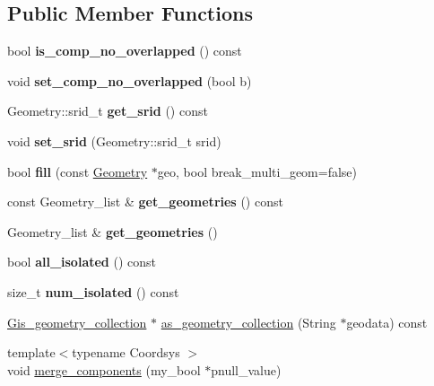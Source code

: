 \subsection*{Public Member Functions}
\begin{DoxyCompactItemize}
\item 
\mbox{\label{classBG__geometry__collection_ab8dca5aefde780d0410bdcca93f70b82}} 
bool {\bfseries is\+\_\+comp\+\_\+no\+\_\+overlapped} () const
\item 
\mbox{\label{classBG__geometry__collection_a1082cce97bb8411af16940999885ad6d}} 
void {\bfseries set\+\_\+comp\+\_\+no\+\_\+overlapped} (bool b)
\item 
\mbox{\label{classBG__geometry__collection_ab15273d17d8eaa7417b9155e4da46a64}} 
Geometry\+::srid\+\_\+t {\bfseries get\+\_\+srid} () const
\item 
\mbox{\label{classBG__geometry__collection_a3c57f4e88b073d0e8a7844ca317bdccc}} 
void {\bfseries set\+\_\+srid} (Geometry\+::srid\+\_\+t srid)
\item 
\mbox{\label{classBG__geometry__collection_a7a266dfad527e800335b0b0be56e7823}} 
bool {\bfseries fill} (const \mbox{\hyperlink{classGeometry}{Geometry}} $\ast$geo, bool break\+\_\+multi\+\_\+geom=false)
\item 
\mbox{\label{classBG__geometry__collection_a30c3aa79adddd0a6f4384c461afb608f}} 
const Geometry\+\_\+list \& {\bfseries get\+\_\+geometries} () const
\item 
\mbox{\label{classBG__geometry__collection_ae40e361bd16c6d74bfcdcc2d41f5d4fe}} 
Geometry\+\_\+list \& {\bfseries get\+\_\+geometries} ()
\item 
\mbox{\label{classBG__geometry__collection_afe549db09e534fa5b4cd0326f4a65a99}} 
bool {\bfseries all\+\_\+isolated} () const
\item 
\mbox{\label{classBG__geometry__collection_aa30d8c730c494f691ad54ae18002bf57}} 
size\+\_\+t {\bfseries num\+\_\+isolated} () const
\item 
\mbox{\hyperlink{classGis__geometry__collection}{Gis\+\_\+geometry\+\_\+collection}} $\ast$ \mbox{\hyperlink{classBG__geometry__collection_aef572d61cb0bd24a4680c7450ac9723a}{as\+\_\+geometry\+\_\+collection}} (String $\ast$geodata) const
\item 
{\footnotesize template$<$typename Coordsys $>$ }\\void \mbox{\hyperlink{classBG__geometry__collection_ad927b9c81246e31a33db8451e8460427}{merge\+\_\+components}} (my\+\_\+bool $\ast$pnull\+\_\+value)
\end{DoxyCompactItemize}


